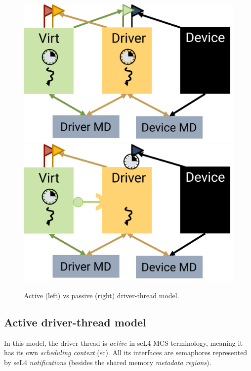 \documentclass[a4paper,12pt]{report}
\newcommand{\Obj}[1]{\textsl{#1}}
\newcommand{\figscale}{0.2}
\begin{document}
\begin{figure}[th]
  \hspace*{\fill}
  \includegraphics[scale=\figscale]{active}
  \hspace{\fill}
  \hspace{\fill}
  \includegraphics[scale=\figscale]{passive}
  \hspace*{\fill}
  \caption{Active (left) vs passive (right) driver-thread model.}
  \label{f:act-pass}
\end{figure}

\subsection{Active driver-thread model}\label{s:dr-active}

In this model, the driver thread is \emph{active} in seL4 MCS
terminology, meaning it has its own \emph{scheduling context}
(\gls{sc}). All its interfaces are semaphores represented by seL4
\Obj{notifications} (besides the shared memory \Obj{metadata
regions}).
\end{document}
